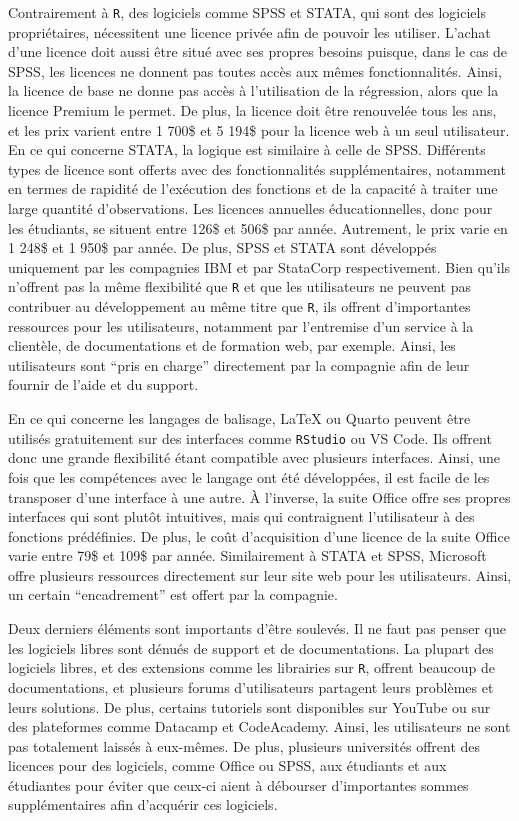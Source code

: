 \documentclass[
  letterpaper,
  DIV=11,
  numbers=noendperiod]{scrreprt}
\begin{document}
Contrairement à \texttt{R}, des logiciels comme SPSS et STATA, qui sont
des logiciels propriétaires, nécessitent une licence privée afin de
pouvoir les utiliser. L'achat d'une licence doit aussi être situé avec
ses propres besoins puisque, dans le cas de SPSS, les licences ne
donnent pas toutes accès aux mêmes fonctionnalités. Ainsi, la licence de
base ne donne pas accès à l'utilisation de la régression, alors que la
licence Premium le permet. De plus, la licence doit être renouvelée tous
les ans, et les prix varient entre 1 700\$ et 5 194\$ pour la licence
web à un seul utilisateur. En ce qui concerne STATA, la logique est
similaire à celle de SPSS. Différents types de licence sont offerts avec
des fonctionnalités supplémentaires, notamment en termes de rapidité de
l'exécution des fonctions et de la capacité à traiter une large quantité
d'observations. Les licences annuelles éducationnelles, donc pour les
étudiants, se situent entre 126\$ et 506\$ par année. Autrement, le prix
varie en 1 248\$ et 1 950\$ par année. De plus, SPSS et STATA sont
développés uniquement par les compagnies IBM et par StataCorp
respectivement. Bien qu'ils n'offrent pas la même flexibilité que
\texttt{R} et que les utilisateurs ne peuvent pas contribuer au
développement au même titre que \texttt{R}, ils offrent d'importantes
ressources pour les utilisateurs, notamment par l'entremise d'un service
à la clientèle, de documentations et de formation web, par exemple.
Ainsi, les utilisateurs sont ``pris en charge'' directement par la
compagnie afin de leur fournir de l'aide et du support.

En ce qui concerne les langages de balisage, LaTeX ou Quarto peuvent
être utilisés gratuitement sur des interfaces comme \texttt{RStudio} ou
VS Code. Ils offrent donc une grande flexibilité étant compatible avec
plusieurs interfaces. Ainsi, une fois que les compétences avec le
langage ont été développées, il est facile de les transposer d'une
interface à une autre. À l'inverse, la suite Office offre ses propres
interfaces qui sont plutôt intuitives, mais qui contraignent
l'utilisateur à des fonctions prédéfinies. De plus, le coût
d'acquisition d'une licence de la suite Office varie entre 79\$ et 109\$
par année. Similairement à STATA et SPSS, Microsoft offre plusieurs
ressources directement sur leur site web pour les utilisateurs. Ainsi,
un certain ``encadrement'' est offert par la compagnie.

Deux derniers éléments sont importants d'être soulevés. Il ne faut pas
penser que les logiciels libres sont dénués de support et de
documentations. La plupart des logiciels libres, et des extensions comme
les librairies sur \texttt{R}, offrent beaucoup de documentations, et
plusieurs forums d'utilisateurs partagent leurs problèmes et leurs
solutions. De plus, certains tutoriels sont disponibles sur YouTube ou
sur des plateformes comme Datacamp et CodeAcademy. Ainsi, les
utilisateurs ne sont pas totalement laissés à eux-mêmes. De plus,
plusieurs universités offrent des licences pour des logiciels, comme
Office ou SPSS, aux étudiants et aux étudiantes pour éviter que ceux-ci
aient à débourser d'importantes sommes supplémentaires afin d'acquérir
ces logiciels.
\end{document}
